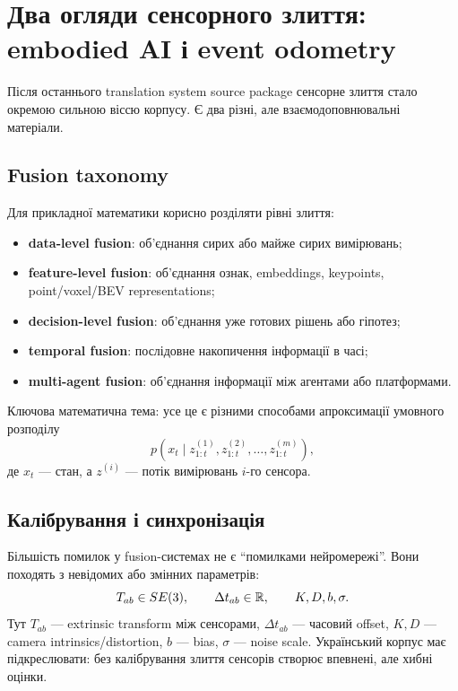 \chapter{Два огляди сенсорного злиття: embodied AI і event odometry}
\label{chap:dual-sensor-fusion}


Після останнього translation system source package сенсорне злиття стало окремою сильною віссю корпусу. Є два різні, але взаємодоповнювальні матеріали.

\section{Fusion taxonomy}

Для прикладної математики корисно розділяти рівні злиття:
\begin{itemize}[leftmargin=*]
\item \textbf{data-level fusion}: об'єднання сирих або майже сирих вимірювань;
\item \textbf{feature-level fusion}: об'єднання ознак, embeddings, keypoints, point/voxel/BEV representations;
\item \textbf{decision-level fusion}: об'єднання уже готових рішень або гіпотез;
\item \textbf{temporal fusion}: послідовне накопичення інформації в часі;
\item \textbf{multi-agent fusion}: об'єднання інформації між агентами або платформами.
\end{itemize}

Ключова математична тема: усе це є різними способами апроксимації умовного розподілу
\begin{equation}
  p(x_t\mid z_{1:t}^{(1)},z_{1:t}^{(2)},\ldots,z_{1:t}^{(m)}),
\end{equation}
де $x_t$ --- стан, а $z^{(i)}$ --- потік вимірювань $i$-го сенсора.

\section{Калібрування і синхронізація}

Більшість помилок у fusion-системах не є ``помилками нейромережі''. Вони походять з невідомих або змінних параметрів:
\begin{equation}
  T_{ab}\in SE(3),\qquad \Delta t_{ab}\in\mathbb{R},\qquad K, D, b, \sigma.
\end{equation}
Тут $T_{ab}$ --- extrinsic transform між сенсорами, $\Delta t_{ab}$ --- часовий offset, $K,D$ --- camera intrinsics/distortion, $b$ --- bias, $\sigma$ --- noise scale. Український корпус має підкреслювати: без калібрування злиття сенсорів створює впевнені, але хибні оцінки.

